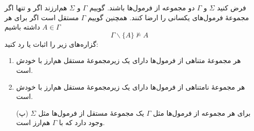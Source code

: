 فرض کنید $\Sigma$ و $\Gamma$ دو مجموعه از فرمول‌ها باشند. گوییم $\Gamma$ و $\Sigma$ هم‌ارزند اگر و تنها اگر مجموعهٔ فرمول‌های یکسانی را ارضا کنند. همچنین گوییم $\Gamma$ مستقل است اگر برای هر $A\in\Gamma$ داشته باشیم
$$
\Gamma\backslash\{A\}\not\models A
$$
گزاره‌های زیر را اثبات یا رد کنید:
\begin{enumerate}
\item
هر مجموعهٔ متناهی از فرمول‌ها دارای یک زیرمجموعهٔ مستقل هم‌ارز با خودش است.
\item
هر مجموعهٔ نامتناهی از فرمول‌ها دارای یک زیرمجموعهٔ مستقل هم‌ارز با خودش است.
\item[(پ)]
برای هر مجموعه از فرمول‌ها مثل $\Gamma$ یک مجموعهٔ مستقل از فرمول‌ها مثل $\Sigma$ وجود دارد که با $\Gamma$ هم‌ارز است.
\end{enumerate}\quad\vspace{-9mm}
